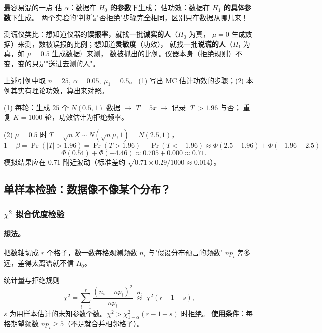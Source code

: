 \begin{wbox}{最容易混的一点}
估 $\alpha$：数据在 \textbf{$H_0$ 的参数}下生成；
估功效：数据在 \textbf{$H_1$ 的具体参数}下生成。
两个实验的"判断是否拒绝"步骤完全相同，区别只在数据从哪儿来！
\end{wbox}

\begin{pbox}
测谎仪类比：想知道仪器的\textbf{误报率}，就找一批\textbf{诚实的人}（$H_0$ 为真，
$\mu=0$ 生成数据）来测，数被误报的比例；想知道\textbf{灵敏度}（功效），
就找一批\textbf{说谎的人}（$H_1$ 为真，如 $\mu=0.5$ 生成数据）来测，
数被抓出的比例。仪器本身（拒绝规则）不变，变的只是"送进去测的人"。
\end{pbox}

\begin{exbox}[功效模拟实战]
上述引例中取 $n=25,\ \alpha=0.05,\ \mu_1=0.5$。
(1) 写出 MC 估计功效的步骤；(2) 本例其实有理论功效，算出来对照。
\end{exbox}
\begin{sol}
(1) 每轮：生成 $25$ 个 $N(0.5,1)$ 数据 $\to$ $T=5\bar x$ $\to$ 记录 $|T|>1.96$ 与否；
重复 $K=1000$ 轮，功效估计为拒绝频率。

(2) $\mu=0.5$ 时 $T=\sqrt n\bar X\sim N(\sqrt n\mu,1)=N(2.5,1)$，
\[
1-\beta=\Pr(|T|>1.96)=\Pr(T>1.96)+\Pr(T<-1.96)
\approx\Phi(2.5-1.96)+\Phi(-1.96-2.5)
\]
\[
=\Phi(0.54)+\Phi(-4.46)\approx0.705+0.000\approx0.71 .
\]
模拟结果应在 $0.71$ 附近波动（标准差约 $\sqrt{0.71\times0.29/1000}\approx0.014$）。
\end{sol}

\subsection{单样本检验：数据像不像某个分布？}

\subsubsection{$\chi^2$ 拟合优度检验}

\paragraph{想法。}把数轴切成 $r$ 个格子，数一数每格观测频数 $n_i$
与"假设分布预言的频数" $np_i$ 差多远，差得太离谱就不信 $H_0$。

\begin{kbox}{统计量与拒绝规则}
\[
\chi^2=\sum_{i=1}^{r}\frac{(n_i-np_i)^2}{np_i}\ \overset{H_0}{\approx}\ \chi^2(r-1-s),
\]
$s$ 为用样本估计的未知参数个数。$\chi^2>\chi^2_{1-\alpha}(r-1-s)$ 时拒绝。
\textbf{使用条件}：每格期望频数 $np_i\ge5$（不足就合并相邻格子）。
\end{kbox}

